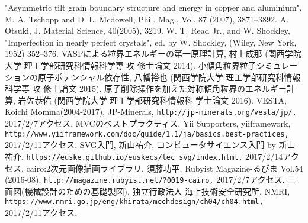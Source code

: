 \begin{thebibliography}{99}
   "Asymmetric tilt grain boundary structure and energy in copper and aluminium", M. A. Tschopp and D. L. Mcdowell, Phil. Mag., Vol. 87 (2007), 3871–3892.
   A. Otsuki, J. Material Science, 40(2005), 3219.
   W. T. Read Jr., and W. Shockley, "Imperfection in nearly perfect crystals", ed. by W. Shockley, (Wiley, New York, 1952) 352--376.
   VASPによる粒界エネルギーの第一原理計算, 村上成那 (関西学院大学 理工学部研究科情報科学専 攻 修士論文 2014).
   小傾角粒界粒子シミュレーションの原子ポテンシャル依存性, 八幡裕也 (関西学院大学 理工学部研究科情報科学専 攻 修士論文 2015).
   原子削除操作を加えた対称傾角粒界のエネルギー計算, 岩佐恭佑 (関西学院大学 理工学部研究科情報科 学士論文 2016).
   VESTA, Koichi Momma(2004-2017), JP-Minerals, \verb|http://jp-minerals.org/vesta/jp/,| 2017/2/7アクセス.
   MVCのベストプラクティス, Yii Supporters, yiiframework, \verb|http://www.yiiframework.com/doc/guide/1.1/ja/basics.best-practices,| 2017/2/11アクセス.
   SVG入門, 新山祐介, コンピュータサイエンス入門 by 新山祐介, \verb|https://euske.github.io/euskecs/lec_svg/index.html,| 2017/2/14アクセス.
   cairo:2次元画像描画ライブラリ, 須藤功平, Rubyist Magazine-るびま Vol.54 (2016-08), \verb|http://magazine.rubyist.net/?0019-cairo,| 2017/2/7アクセス.
   三面図(機械設計のための基礎製図), 独立行政法人 海上技術安全研究所, NMRI, \verb|https://www.nmri.go.jp/eng/khirata/mechdesign/ch04/ch04.html,| 2017/2/11アクセス.
\end{thebibliography}
